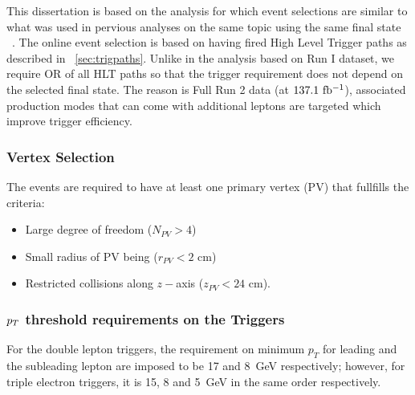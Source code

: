 This dissertation is based on the analysis for which event selections are similar to what was used in pervious analyses on the same topic using the same final state ~\cite{CMS:2018mmw, CMS:2017jkd, Chatrchyan:2013mxa, Khachatryan:2014kca}. 
The online event selection is based on having fired High Level Trigger paths as described in ~\ref{sec:trigpaths}.  
Unlike in the analysis based on Run I dataset, we require OR of all HLT paths so that the trigger requirement does not depend on the selected final state. 
The reason is Full Run 2 data (at $137.1~\mathrm{fb^{-1}}$), associated production modes that can come with additional leptons are targeted which improve trigger efficiency. %
\subsubsection{Vertex Selection}
The events are required to have at least one primary vertex (PV) that fullfills the criteria:
\begin{itemize}
	\item Large degree of freedom ($N_{PV}>4$)
	\item Small radius of PV being ($r_{PV}<2$ cm)
	\item Restricted collisions along $z-$axis ($z_{PV}<24$ cm).
\end{itemize}
\subsubsection{$p_T$ threshold requirements on the Triggers}
For the double lepton triggers, the requirement on minimum $p_{T}$ for leading and the subleading lepton are imposed to be 17 and 8~GeV respectively; however, for triple electron triggers, it is 15, 8 and 5~GeV in the same order respectively.  

